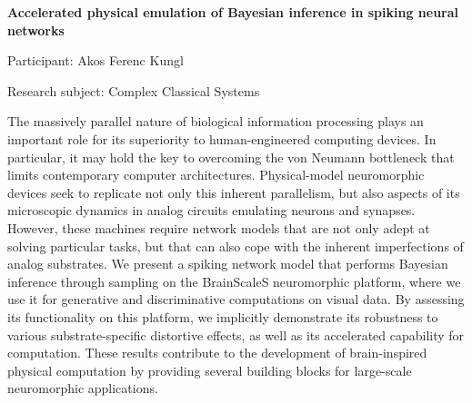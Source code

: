 \hfill 

\begin{minipage}[t]{1.0\textwidth}

\begin{center}

{{\large\bfseries Accelerated physical emulation of Bayesian inference in spiking neural networks}\par}

\end{center}

{\noindent Participant: Akos Ferenc Kungl\par} 

{\noindent Research subject: Complex Classical Systems\par}\medskip

\noindent The massively parallel nature of biological information processing plays an important role for its superiority to human-engineered computing devices.
In particular, it may hold the key to overcoming the von Neumann bottleneck that limits contemporary computer architectures.
Physical-model neuromorphic devices seek to replicate not only this inherent parallelism, but also aspects of its microscopic dynamics in analog circuits emulating neurons and synapses.
However, these machines require network models that are not only adept at solving particular tasks, but that can also cope with the inherent imperfections of analog substrates.
We present a spiking network model that performs Bayesian inference through sampling on the BrainScaleS neuromorphic platform, where we use it for generative and discriminative computations on visual data.
By assessing its functionality on this platform, we implicitly demonstrate its robustness to various substrate-specific distortive effects, as well as its accelerated capability for computation.
These results contribute to the development of brain-inspired physical computation by providing several building blocks for large-scale neuromorphic applications. \par\end{minipage}

\hfill 


